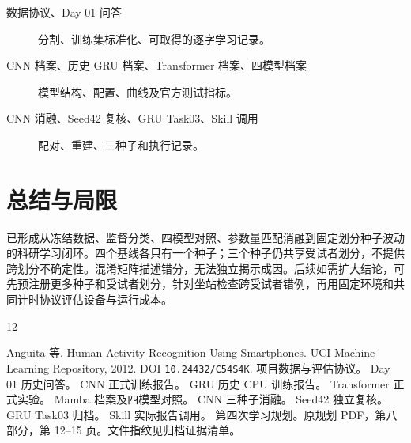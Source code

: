 \documentclass[UTF8,a4paper,11pt,fontset=none]{ctexart}
\begin{document}
\begin{description}
\item[数据协议、Day 01 问答] 分割、训练集标准化、可取得的逐字学习记录。\cite{protocol,day}
\item[CNN 档案、历史 GRU 档案、Transformer 档案、四模型档案] 模型结构、配置、曲线及官方测试指标。\cite{cnn,gru,tr,four}
\item[CNN 消融、Seed42 复核、GRU Task03、Skill 调用] 配对、重建、三种子和执行记录。\cite{abl,trace,task,skill}
\end{description}


\clearpage
\section{总结与局限}
已形成从冻结数据、监督分类、四模型对照、参数量匹配消融到固定划分种子波动的科研学习闭环。四个基线各只有一个种子；三个种子仍共享受试者划分，不提供跨划分不确定性。混淆矩阵描述错分，无法独立揭示成因。后续如需扩大结论，可先预注册更多种子和受试者划分，针对坐站检查跨受试者错例，再用固定环境和共同计时协议评估设备与运行成本。

\begin{thebibliography}{12}
\raggedright
{} Anguita 等. Human Activity Recognition Using Smartphones. UCI Machine Learning Repository, 2012. DOI \texttt{10.24432/C54S4K}.
 项目数据与评估协议。 
 Day 01 历史问答。 
 CNN 正式训练报告。 
 GRU 历史 CPU 训练报告。 
 Transformer 正式实验。 
 Mamba 档案及四模型对照。 
 CNN 三种子消融。 
 Seed42 独立复核。 
 GRU Task03 归档。 
 Skill 实际报告调用。 
 第四次学习规划。原规划 PDF，第八部分，第 12--15 页。文件指纹见归档证据清单。
\end{thebibliography}
\end{document}
